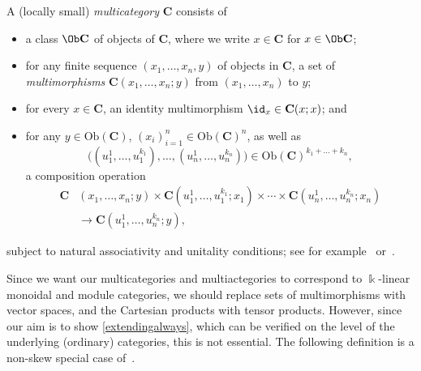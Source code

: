 \begin{definition}\label{def:multicategory}
  A (locally small) \emph{multicategory} \(\mathbf{C}\) consists of
  \begin{itemize}
    \item a class \(\Ob\mathbf{C}\) of objects of \(\mathbf{C}\), where we write \(x \in \mathbf{C}\) for \(x \in \Ob\mathbf{C}\);
    \item for any finite sequence \((x_{1},\ldots, x_{n}, y)\) of objects in \(\mathbf{C}\),
    a set of \emph{multimorphisms} \(\mathbf{C}(x_{1},\ldots, x_{n}; y)\) from \((x_{1},\ldots,x_{n})\) to \(y\);
    \item for every \(x \in \mathbf{C}\), an identity multimorphism \(\id_{x} \in \mathbf{C}(x;x)\); and
    \item for any \(y \in \mathrm{Ob}(\mathbf{C})\), \({(x_{i})}_{i=1}^{n} \in {\mathrm{Ob}(\mathbf{C})}^{n}\),
    as well as
    \[
      \big((u_1^1, \dots, u_1^{k_1}), \dots, (u_n^1, \dots, u_n^{k_n})\big) \in {\mathrm{Ob}(\mathbf{C})}^{k_{1} + \dots + k_n},
    \]
    a composition operation
    \[
      \begin{aligned}
        \mathbf{C}&(x_{1},\ldots,x_{n}; y) \times \mathbf{C}(u_{1}^{1},\ldots, u_{1}^{k_{1}}; x_{1}) \times \cdots \times \mathbf{C}(u_{n}^{1},\ldots, u_{n}^{k_{n}}; x_{n}) \\
         &\to \mathbf{C}(u_{1}^{1},\ldots,u_{n}^{k_{n}}; y),
      \end{aligned}
    \]
  \end{itemize}
  subject to natural associativity and unitality conditions; see for example~\cite[Section~2.1]{leinster04:higher} or~\cite[Definition~2.1]{hermida00:repres}.
\end{definition}

Since we want our multicategories and multiactegories to correspond to \(\Bbbk\)\hyp{}linear monoidal and module categories,
we should replace sets of multimorphisms with vector spaces,
and the Cartesian products with tensor products.
However, since our aim is to show \cref{extendingalways},
which can be verified on the level of the underlying (ordinary) categories,
this is not essential.
The following definition is a non-skew special case of~\cite[Definition~6.9]{arkor24}.

